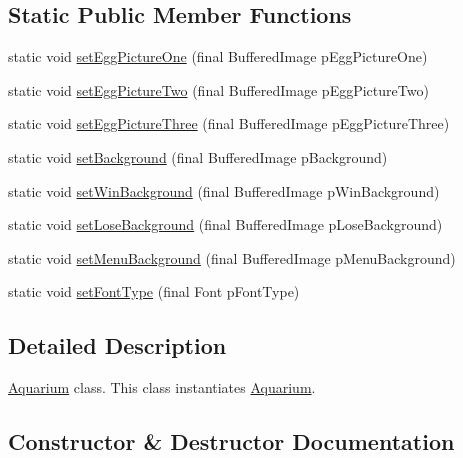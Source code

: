 \subsection*{Static Public Member Functions}
\begin{DoxyCompactItemize}
\item 
static void \mbox{\hyperlink{class_aquarium_a05ee79d2ed1f22d34a02ce301a2527c5}{set\+Egg\+Picture\+One}} (final Buffered\+Image p\+Egg\+Picture\+One)
\item 
static void \mbox{\hyperlink{class_aquarium_a7ff613dbc0b8c2ffdd7e0ce1b96a5d5f}{set\+Egg\+Picture\+Two}} (final Buffered\+Image p\+Egg\+Picture\+Two)
\item 
static void \mbox{\hyperlink{class_aquarium_a7f7c1d667dacf3e52f592ff20a939be0}{set\+Egg\+Picture\+Three}} (final Buffered\+Image p\+Egg\+Picture\+Three)
\item 
static void \mbox{\hyperlink{class_aquarium_ab59b9af7bb093e555e2b683dcf39e498}{set\+Background}} (final Buffered\+Image p\+Background)
\item 
static void \mbox{\hyperlink{class_aquarium_a4133a27a6feca8d8cdffaad0ada7da0f}{set\+Win\+Background}} (final Buffered\+Image p\+Win\+Background)
\item 
static void \mbox{\hyperlink{class_aquarium_a339b7094b59172816c41e5284411893e}{set\+Lose\+Background}} (final Buffered\+Image p\+Lose\+Background)
\item 
static void \mbox{\hyperlink{class_aquarium_a97fa4960f66a18b449a122ef11abcb0b}{set\+Menu\+Background}} (final Buffered\+Image p\+Menu\+Background)
\item 
static void \mbox{\hyperlink{class_aquarium_a65f0247ca0458a289572ec8cd375e9f1}{set\+Font\+Type}} (final Font p\+Font\+Type)
\end{DoxyCompactItemize}


\subsection{Detailed Description}
\mbox{\hyperlink{class_aquarium}{Aquarium}} class. This class instantiates \mbox{\hyperlink{class_aquarium}{Aquarium}}. 

\subsection{Constructor \& Destructor Documentation}
\mbox{\label{class_aquarium_a173f8b85de9d2f61c02d13ebdc05026c}} 
